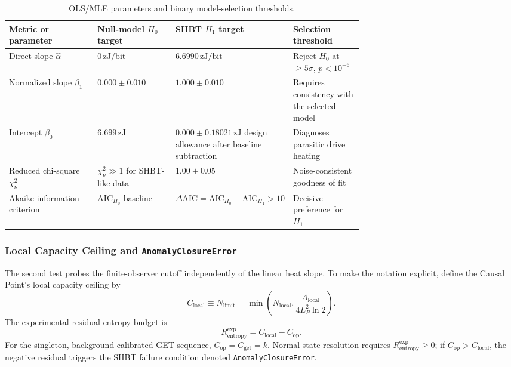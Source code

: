 \documentclass[11pt,letterpaper]{article}
\theoremstyle{plain}
\newcommand{\Lp}{L_P}
\begin{document}
\begin{table}[htbp]
\centering
\small
\begin{tabularx}{\linewidth}{@{}L{0.25\linewidth}L{0.22\linewidth}L{0.22\linewidth}Y@{}}
\toprule
Metric or parameter & Null-model \(H_0\) target & SHBT \(H_1\) target & Selection threshold \\
\midrule
Direct slope \(\widehat{\alpha}\) & \(0\,\mathrm{zJ/bit}\) & \(6.6990\,\mathrm{zJ/bit}\) & Reject \(H_0\) at \(\ge5\sigma\), \(p<10^{-6}\) \\
Normalized slope \(\beta_1\) & \(0.000\pm0.010\) & \(1.000\pm0.010\) & Requires consistency with the selected model \\
Intercept \(\beta_0\) & \(6.699\,\mathrm{zJ}\) & \(0.000\pm0.18021\,\mathrm{zJ}\) design allowance after baseline subtraction & Diagnoses parasitic drive heating \\
Reduced chi-square \(\chi_\nu^2\) & \(\chi_\nu^2\gg1\) for SHBT-like data & \(1.00\pm0.05\) & Noise-consistent goodness of fit \\
Akaike information criterion & \(\mathrm{AIC}_{H_0}\) baseline & \(\Delta\mathrm{AIC}=\mathrm{AIC}_{H_0}-\mathrm{AIC}_{H_1}>10\) & Decisive preference for \(H_1\) \\
\bottomrule
\end{tabularx}
\caption{OLS/MLE parameters and binary model-selection thresholds.}
\label{tab:calorimetry-model-selection}
\end{table}

\subsubsection{Local Capacity Ceiling and \texttt{AnomalyClosureError}}

The second test probes the finite-observer cutoff independently of the linear
heat slope.  To make the notation explicit, define the Causal Point's local
capacity ceiling by
\begin{equation}
\label{eq:calorimetry-local-capacity-ceiling}
 \boxed{
 C_{\text{local}}
 \equiv
 N_{\text{limit}}
 =
 \min\!\left(
 N_{\text{local}},
 \frac{A_{\text{local}}}{4\Lp^2\ln2}
 \right).
 }
\end{equation}
The experimental residual entropy budget is
\begin{equation}
\label{eq:calorimetry-experimental-residual-budget}
 R_{\text{entropy}}^{\text{exp}}
 =
 C_{\text{local}}-C_{\text{op}}.
\end{equation}
For the singleton, background-calibrated GET sequence,
\(C_{\text{op}}=C_{\text{get}}=k\).  Normal state resolution requires
\(R_{\text{entropy}}^{\text{exp}}\ge0\); if
\(C_{\text{op}}>C_{\text{local}}\), the negative residual triggers the SHBT failure
condition denoted \texttt{AnomalyClosureError}.
\end{document}
